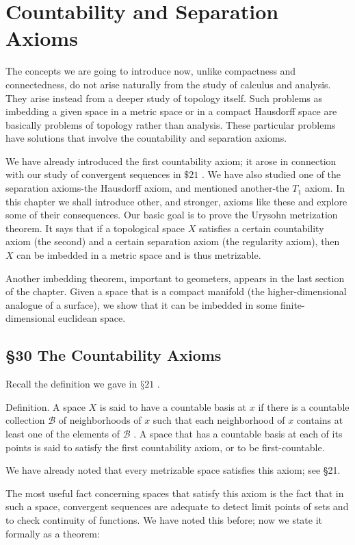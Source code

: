 \chapter{Countability and Separation Axioms}

The concepts we are going to introduce now, unlike compactness and connectedness, do not arise naturally from the study of calculus and analysis. They arise instead from a deeper study of topology itself. Such problems as imbedding a given space in a metric space or in a compact Hausdorff space are basically problems of topology rather than analysis. These particular problems have solutions that involve the countability and separation axioms.

We have already introduced the first countability axiom; it arose in connection with our study of convergent sequences in \(\$ {21}\) . We have also studied one of the separation axioms-the Hausdorff axiom, and mentioned another-the \({T}_{1}\) axiom. In this chapter we shall introduce other, and stronger, axioms like these and explore some of their consequences. Our basic goal is to prove the Urysohn metrization theorem. It says that if a topological space \(X\) satisfies a certain countability axiom (the second) and a certain separation axiom (the regularity axiom), then \(X\) can be imbedded in a metric space and is thus metrizable.

Another imbedding theorem, important to geometers, appears in the last section of the chapter. Given a space that is a compact manifold (the higher-dimensional analogue of a surface), we show that it can be imbedded in some finite-dimensional euclidean space.

\section*{§30 The Countability Axioms}

Recall the definition we gave in \(§{21}\) .

Definition. A space \(X\) is said to have a countable basis at \(x\) if there is a countable collection \(\mathcal{B}\) of neighborhoods of \(x\) such that each neighborhood of \(x\) contains at least one of the elements of \(\mathcal{B}\) . A space that has a countable basis at each of its points is said to satisfy the first countability axiom, or to be first-countable.

We have already noted that every metrizable space satisfies this axiom; see §21.

The most useful fact concerning spaces that satisfy this axiom is the fact that in such a space, convergent sequences are adequate to detect limit points of sets and to check continuity of functions. We have noted this before; now we state it formally as a theorem:

